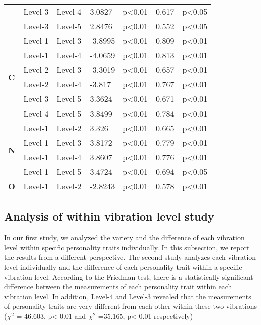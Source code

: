 \begin{longtable}{ |p{0.5cm}| p{1.5cm}|p{1.5cm}|p{1.3cm}| p{1.6cm}|p{1cm}|p{1.5cm}|  }
&Level-3		&Level-4			&3.0827			&p<0.01			&0.617 		&p<0.05\\
&Level-3		&Level-5			&2.8476			&p<0.01			&0.552		&p<0.05\\
\hline 
\hline 
\multirow{6}{*}{\textbf{C}} 
&Level-1		&Level-3			&-3.8995			&p<0.01			&0.809 		&p<0.01\\
&Level-1		&Level-4			&-4.0659			&p<0.01			&0.813 		&p<0.01\\
&Level-2		&Level-3			&-3.3019			&p<0.01			&0.657		&p<0.01\\
&Level-2		&Level-4			&-3.817			&p<0.01			&0.767 		&p<0.01\\
&Level-3		&Level-5			&3.3624			&p<0.01			&0.671 		&p<0.01\\
&Level-4		&Level-5			&3.8499			&p<0.01			&0.784 		&p<0.01\\
\hline 
\hline 
\multirow{4}{*}{\textbf{N}} 
&Level-1		&Level-2			&3.326			&p<0.01			&0.665 		&p<0.01\\
&Level-1		&Level-3			&3.8172			&p<0.01			&0.779 		&p<0.01\\
&Level-1		&Level-4			&3.8607			&p<0.01			&0.776  		&p<0.01\\
&Level-1		&Level-5			&3.4724			&p<0.01			&0.694		&p<0.05\\
\hline 
\hline 
\multirow{1}{*}{\textbf{O}} 
&Level-1		&Level-2			&-2.8243			&p<0.01			&0.578 		&p<0.01\\
\hline 
\end{longtable}

\subsection{Analysis of within vibration level study}
\label{Study2(M-M)}
In our first study, we analyzed the variety and the difference of each vibration level within specific personality traits individually. In this subsection, we report the results from a different perspective. The second study analyzes each vibration level individually and the difference of each personality trait within a specific vibration level. According to the Friedman test, there is a statistically significant difference between the measurements of each personality trait within each vibration level. In addition, Level-4 and Level-3 revealed that the measurements of personality traits are very different from each other within these two vibrations ($\chi^2$ = 46.603, p< 0.01 and $\chi^2$ =35.165, p< 0.01 respectively)

